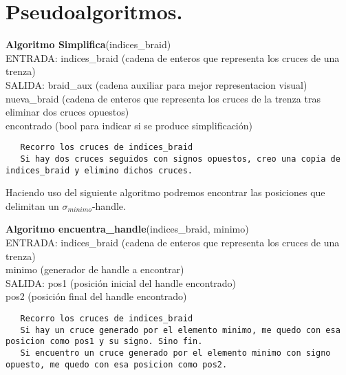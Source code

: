 
\section{Pseudoalgoritmos.}


\begin{alg}
	\textbf{Algoritmo Simplifica}(indices\_braid)\\
	ENTRADA: indices\_braid (cadena de enteros que representa los cruces de una trenza)\\
	SALIDA: \hspace{0.4cm} braid\_aux (cadena auxiliar para mejor representacion visual) \\
    \hspace*{2.2cm} nueva\_braid (cadena de enteros que representa los cruces de la trenza tras eliminar dos cruces opuestos)\\
    \hspace*{2.2cm} encontrado (bool para indicar si se produce simplificación)
	
\begin{lstlisting}
   Recorro los cruces de indices_braid
   Si hay dos cruces seguidos con signos opuestos, creo una copia de indices_braid y elimino dichos cruces. 
\end{lstlisting}
\end{alg}

\newpage
Haciendo uso del siguiente algoritmo podremos encontrar las posiciones que delimitan un $\sigma_{minimo}$-handle.
\begin{alg}
	\textbf{Algoritmo encuentra\_handle}(indices\_braid, minimo)\\
	ENTRADA: indices\_braid (cadena de enteros que representa los cruces de una trenza)\\
	\hspace*{2.2cm} minimo (generador de handle a encontrar) \\
	SALIDA: \hspace{0.4cm} pos1 (posición inicial del handle encontrado) \\
	\hspace*{2.2cm} pos2 (posición final del handle encontrado)
	
\begin{lstlisting}
   Recorro los cruces de indices_braid
   Si hay un cruce generado por el elemento minimo, me quedo con esa posicion como pos1 y su signo. Sino fin.
   Si encuentro un cruce generado por el elemento minimo con signo opuesto, me quedo con esa posicion como pos2.
\end{lstlisting}
\end{alg}

